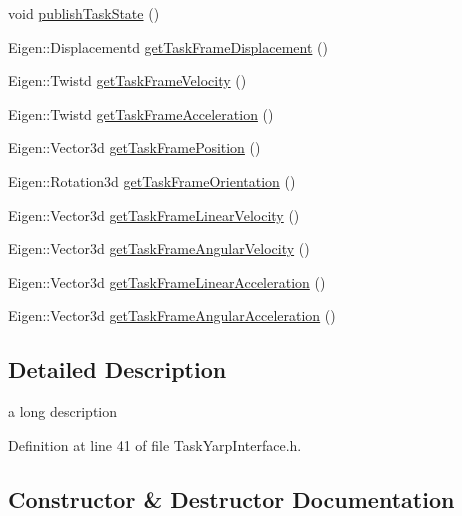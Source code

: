 \begin{DoxyCompactItemize}
\item 
void \hyperlink{classocra_1_1TaskYarpInterface_a758e222fe2e69f6932b13e275636e7be}{publish\+Task\+State} ()
\item 
Eigen\+::\+Displacementd \hyperlink{classocra_1_1TaskYarpInterface_aedcb64b913403fa8d5ba41be208732d1}{get\+Task\+Frame\+Displacement} ()
\item 
Eigen\+::\+Twistd \hyperlink{classocra_1_1TaskYarpInterface_a073e124334125ce712c194a5e6826038}{get\+Task\+Frame\+Velocity} ()
\item 
Eigen\+::\+Twistd \hyperlink{classocra_1_1TaskYarpInterface_a59a7442dac9b971d36ba792b05d2afba}{get\+Task\+Frame\+Acceleration} ()
\item 
Eigen\+::\+Vector3d \hyperlink{classocra_1_1TaskYarpInterface_a5bdab48cc56cd473f007bb6f1c9c739d}{get\+Task\+Frame\+Position} ()
\item 
Eigen\+::\+Rotation3d \hyperlink{classocra_1_1TaskYarpInterface_a9878b0030948a97cacbe6aef76846a48}{get\+Task\+Frame\+Orientation} ()
\item 
Eigen\+::\+Vector3d \hyperlink{classocra_1_1TaskYarpInterface_ab7773bffb7b1cb3fc9968108afa30665}{get\+Task\+Frame\+Linear\+Velocity} ()
\item 
Eigen\+::\+Vector3d \hyperlink{classocra_1_1TaskYarpInterface_adc74f01320a4326756d855b1e24e395f}{get\+Task\+Frame\+Angular\+Velocity} ()
\item 
Eigen\+::\+Vector3d \hyperlink{classocra_1_1TaskYarpInterface_a798dc2edfbffa9759353dcc0afe96fff}{get\+Task\+Frame\+Linear\+Acceleration} ()
\item 
Eigen\+::\+Vector3d \hyperlink{classocra_1_1TaskYarpInterface_a68eee445c141dec3251ab40a38314c81}{get\+Task\+Frame\+Angular\+Acceleration} ()
\end{DoxyCompactItemize}


\subsection{Detailed Description}
a long description 

Definition at line 41 of file Task\+Yarp\+Interface.\+h.



\subsection{Constructor \& Destructor Documentation}
